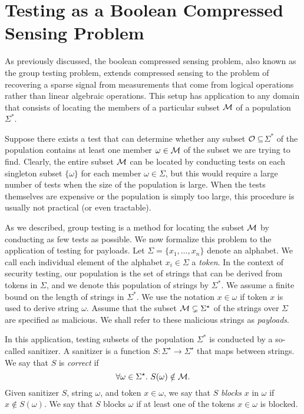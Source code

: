 \section{Testing as a Boolean Compressed Sensing Problem}
As previously discussed, the boolean compressed sensing problem, also known as the group testing problem, extends compressed sensing to the problem of recovering a sparse signal from measurements that come from logical operations rather than linear algebraic operations. This setup has application to any domain that consists of locating the members of a particular subset $\cal{M}$ of a population $\Sigma^*$. 

Suppose there exists a test that can determine whether any subset $\cal{O}\subseteq$$\Sigma^*$ of the population contains at least one member $\omega\in\cal{M}$ of the subset we are trying to find. Clearly, the entire subset $\cal{M}$ can be located by conducting tests on each singleton subset $\{\omega\}$ for each member $\omega\in\Sigma$, but this would require a large number of tests when the size of the population is large.  When the tests themselves are expensive or the population is simply too large, this procedure is usually not practical (or even tractable).  

As we described, group testing is a method for locating the subset $\cal{M}$ by conducting as few tests as possible. We now formalize this problem to the application of testing for payloads. Let $\Sigma=\{ x_1,\ldots,x_n \}$ denote an alphabet. We call each individual element of the alphabet $x_i\in\Sigma$ a \emph{token}. In the context of security testing, our population is the set of strings that can be derived from tokens in $\Sigma$, and we denote this population of strings by $\Sigma^*$. We assume a finite bound on the length of strings in $\Sigma^*$. We use the notation $x\in\omega$ if token $x$ is used to derive string $\omega$. Assume that the subset ${\cal M} \subsetneq \Sigma^{\star}$ of the strings over $\Sigma$ are specified as malicious. We shall refer to these malicious strings as \emph{payloads}. 

In this application, testing subsets of the population $\Sigma^*$ is conducted by a so-called sanitizer. A sanitizer is a function 
$S \colon \Sigma^{\star} \rightarrow \Sigma^{\star}$ that maps between strings. We say that $S$ is \emph{correct} if
$$
\forall \omega \in \Sigma^{\star}.\ S(\omega) \notin {\cal M}.
$$ 
Given sanitizer $S$, string $\omega$, and token $x \in \omega$, we say that $S$ \emph{blocks} $x$ in $\omega$ if $x \notin S(\omega)$. We say that $S$ blocks $\omega$ if at least one of the tokens $x \in \omega$ is blocked.

